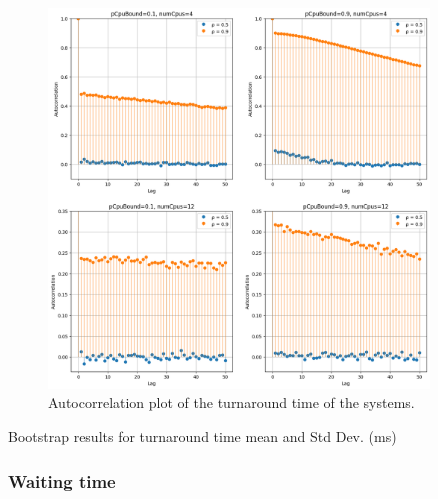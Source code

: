 \begin{figure}[H]
    \captionsetup{type=figure}
    \centering
    \includegraphics[width=0.9\textwidth]{./images/04/fcfs/turn/autocorrelation.png}
    \caption{Autocorrelation plot of the turnaround time of the systems.}
    \label{fig:fcfsTurnAutocorrelation}
\end{figure}

\begin{table}[H]
    \centering
    \scriptsize
    
    \caption{Bootstrap results for turnaround time mean and Std Dev. (ms)}
    \label{tab:fcfsTurn}
\end{table}


\subsubsection{Waiting time}


